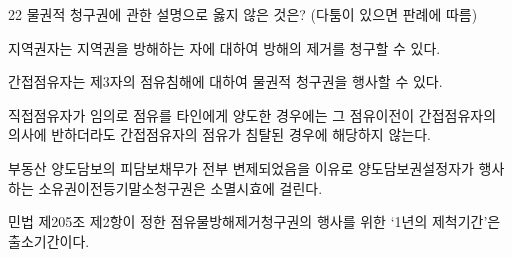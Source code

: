 \begin{question}{22}
물권적 청구권에 관한 설명으로 옳지 않은 것은? (다툼이 있으면 판례에 따름)
\begin{choices}
  \item 지역권자는 지역권을 방해하는 자에 대하여 방해의 제거를 청구할 수 있다.
  \item 간접점유자는 제3자의 점유침해에 대하여 물권적 청구권을 행사할 수 있다.
  \item 직접점유자가 임의로 점유를 타인에게 양도한 경우에는 그 점유이전이 간접점유자의 의사에 반하더라도 간접점유자의 점유가 침탈된 경우에 해당하지 않는다.
  \item 부동산 양도담보의 피담보채무가 전부 변제되었음을 이유로 양도담보권설정자가 행사하는 소유권이전등기말소청구권은 소멸시효에 걸린다.
  \item 민법 제205조 제2항이 정한 점유물방해제거청구권의 행사를 위한 ‘1년의 제척기간’은 출소기간이다.
\end{choices}
\end{question}

